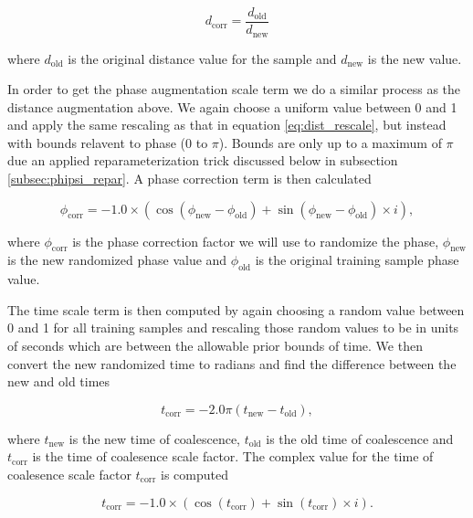\begin{equation}
    d_{\textrm{corr}} = \frac{d_{\textrm{old}}}{d_{\textrm{new}}}
\end{equation}

where $d_{\textrm{old}}$ is the original distance value for the sample 
and $d_{\textrm{new}}$ is the new value. 

%
%

In order to get the phase augmentation scale term 
we do a similar process as the distance 
augmentation above. We again choose a uniform value between 0 and 1 and 
apply the same rescaling as that in equation \ref{eq:dist_rescale}, but 
instead with bounds relavent to phase (0 to $\pi$). Bounds are only 
up to a maximum of $\pi$ due an applied reparameterization trick 
discussed below in subsection \ref{subsec:phipsi_repar}. A phase 
correction term is then calculated

\begin{equation}
    \phi_{\textrm{corr}} = -1.0 \times (\cos(\phi_{\textrm{new}} - \phi_{\textrm{old}}) + \sin(\phi_{\textrm{new}} - \phi_{\textrm{old}}) \times i),
\end{equation}

where $\phi_{\textrm{corr}}$ is the phase correction factor we 
will use to randomize the phase, $\phi_{\textrm{new}}$ is the new 
randomized phase value and $\phi_{\textrm{old}}$ is the original 
training sample phase value.

%
%

The time scale term is then computed by again choosing a random value 
between 0 and 1 for all training samples and rescaling those random 
values to be in units of seconds which are between the allowable 
prior bounds of time. We then convert the new randomized time 
to radians and find the difference between the new and old 
times

\begin{equation}
    t_{\textrm{corr}} = -2.0\pi (t_{\textrm{new}} - t_{\textrm{old}}),
\end{equation}

where $t_{\textrm{new}}$ is the new time of coalescence, $t_{\textrm{old}}$ 
is the old time of coalescence and $t_{\textrm{corr}}$ is the time of coalesence scale factor. The complex value for the time of coalesence 
scale factor $t_{\textrm{corr}}$ is computed 

\begin{equation}
    t_{\textrm{corr}} = -1.0 \times (\cos(t_{\textrm{corr}}) + \sin(t_{\textrm{corr}}) \times i).
\end{equation}

